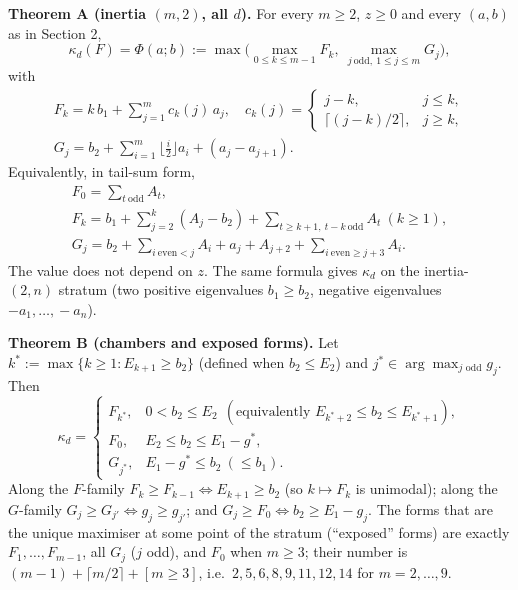 \documentclass[
  11pt,
  a4paper,
]{article}
\begin{document}
\textbf{Theorem A (inertia \((m,\allowbreak{}2)\), all \(d\)).} For every \(m\ge2\),
\(z\ge0\) and every \((a,\allowbreak{}b)\) as in Section 2,
\[\kappa_d(F)=\Phi(a;b):=\max\Big(\max_{0\le k\le m-1}F_k,\ \max_{j\ \mathrm{odd},\ 1\le j\le m}G_j\Big),\]
with
\[\begin{gathered}F_k=k\,b_1+\sum_{j=1}^m c_k(j)\,a_j,\quad c_k(j)=\begin{cases}j-k,& j\le k,\\ \lceil (j-k)/2\rceil,& j\ge k,\end{cases}\\  G_j=b_2+\sum_{i=1}^m\Big\lfloor \frac i2\Big\rfloor a_i+(a_j-a_{j+1}).\end{gathered}\]
Equivalently, in tail-sum form,
\[\begin{gathered}F_0=\sum_{t\ \mathrm{odd}}A_t,\\  F_k=b_1+\sum_{j=2}^{k}(A_j-b_2)+\sum_{t\ge k+1,\ t-k\ \mathrm{odd}}A_t\ (k\ge1),\\  G_j=b_2+\sum_{i\ \mathrm{even}<j}A_i+a_j+A_{j+2}+\sum_{i\ \mathrm{even}\ge j+3}A_i .\end{gathered}\]
The value does not depend on \(z\). The same formula gives \(\kappa_d\)
on the inertia-\((2,\allowbreak{}n)\) stratum (two positive eigenvalues
\(b_1\ge b_2\), negative eigenvalues \(-a_1,\allowbreak{}\dots,\allowbreak{}-a_n\)).

\textbf{Theorem B (chambers and exposed forms).} Let
\(k^*:=\max\{k\ge1: E_{k+1}\ge b_2\}\) (defined when \(b_2\le E_2\)) and
\(j^*\in\arg\max_{j\text{ odd}}g_j\). Then
\[\kappa_d=\begin{cases}F_{k^*}, & 0<b_2\le E_2\ \ (\text{equivalently } E_{k^*+2}\le b_2\le E_{k^*+1}),\\ F_0, & E_2\le b_2\le E_1-g^*,\\ G_{j^*}, & E_1-g^*\le b_2\ (\le b_1).\end{cases}\]
Along the \(F\)-family \(F_k\ge F_{k-1}\iff E_{k+1}\ge b_2\) (so
\(k\mapsto F_k\) is unimodal); along the \(G\)-family
\(G_j\ge G_{j'}\iff g_j\ge g_{j'}\); and
\(G_j\ge F_0\iff b_2\ge E_1-g_j\). The forms that are the unique
maximiser at some point of the stratum (``exposed'' forms) are exactly
\(F_1,\allowbreak{}\dots,\allowbreak{}F_{m-1}\), all \(G_j\) (\(j\) odd), and \(F_0\) when
\(m\ge3\); their number is \((m-1)+\lceil m/2\rceil+[m\ge3]\),
i.e.~\(2,\allowbreak{}5,\allowbreak{}6,\allowbreak{}8,\allowbreak{}9,\allowbreak{}11,\allowbreak{}12,\allowbreak{}14\) for \(m=2,\allowbreak{}\dots,\allowbreak{}9\).
\end{document}
